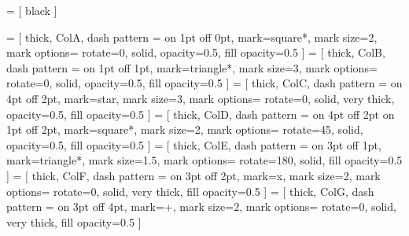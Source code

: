 
 = [
black
]


 = [
thick, ColA, dash pattern = {on 1pt off 0pt},
mark=square*, mark size=2, mark options={
	rotate=0,
	solid,
	opacity=0.5,
	fill opacity=0.5
}
]
 = [
thick, ColB, dash pattern = {on 1pt off 1pt},
mark=triangle*, mark size=3, mark options={
	rotate=0,
	solid,
	opacity=0.5,
	fill opacity=0.5
}
]
 = [
thick, ColC, dash pattern = {on 4pt off 2pt},
mark=star, mark size=3, mark options={
	rotate=0,
	solid,
	very thick,
	opacity=0.5,
	fill opacity=0.5
}
]
 = [
thick, ColD, dash pattern = {on 4pt off 2pt on 1pt off 2pt},
mark=square*, mark size=2, mark options={
	rotate=45,
	solid,
	opacity=0.5,
	fill opacity=0.5
}
]
 = [
thick, ColE, dash pattern = {on 3pt off 1pt},
mark=triangle*, mark size=1.5, mark options={
	rotate=180,
	solid,
	fill opacity=0.5
}
]
 = [
thick, ColF, dash pattern = {on 3pt off 2pt},
mark=x, mark size=2, mark options={
	rotate=0,
	solid,
	very thick,
	fill opacity=0.5
}
]
 = [
thick, ColG, dash pattern = {on 3pt off 4pt},
mark=+, mark size=2, mark options={
	rotate=0,
	solid,
	very thick,
	fill opacity=0.5
}
]

